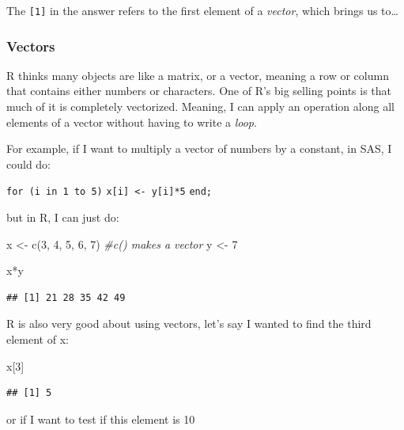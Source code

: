 \documentclass[
]{article}
\newenvironment{Shaded}{\begin{snugshade}}{\end{snugshade}}
\newcommand{\CommentTok}[1]{\textcolor[rgb]{0.56,0.35,0.01}{\textit{#1}}}
\newcommand{\DecValTok}[1]{\textcolor[rgb]{0.00,0.00,0.81}{#1}}
\newcommand{\FunctionTok}[1]{\textcolor[rgb]{0.00,0.00,0.00}{#1}}
\newcommand{\NormalTok}[1]{#1}
\newcommand{\OtherTok}[1]{\textcolor[rgb]{0.56,0.35,0.01}{#1}}
\newcommand{\SpecialCharTok}[1]{\textcolor[rgb]{0.00,0.00,0.00}{#1}}
\begin{document}
The \texttt{{[}1{]}} in the answer refers to the first element of a \emph{vector}, which
brings us to\ldots{}

\hypertarget{vectors}{%
\subsubsection{Vectors}\label{vectors}}

R thinks many objects are like a matrix, or a vector, meaning a row or
column that contains either numbers or characters. One of R's big
selling points is that much of it is completely vectorized. Meaning, I
can apply an operation along all elements of a vector without having to
write a \emph{loop}.

For example, if I want to multiply a vector of numbers by a constant, in
SAS, I could do:

\texttt{for\ (i\ in\ 1\ to\ 5)} \texttt{x{[}i{]}\ \textless{}-\ y{[}i{]}*5} \texttt{end;}

but in R, I can just do:

\begin{Shaded}
\begin{Highlighting}[]
\NormalTok{x }\OtherTok{\textless{}{-}} \FunctionTok{c}\NormalTok{(}\DecValTok{3}\NormalTok{, }\DecValTok{4}\NormalTok{, }\DecValTok{5}\NormalTok{, }\DecValTok{6}\NormalTok{, }\DecValTok{7}\NormalTok{)}
\CommentTok{\#c() makes a vector}
\NormalTok{y }\OtherTok{\textless{}{-}} \DecValTok{7}

\NormalTok{x}\SpecialCharTok{*}\NormalTok{y}
\end{Highlighting}
\end{Shaded}

\begin{verbatim}
## [1] 21 28 35 42 49
\end{verbatim}

R is also very good about using vectors, let's say I wanted to find the
third element of x:

\begin{Shaded}
\begin{Highlighting}[]
\NormalTok{x[}\DecValTok{3}\NormalTok{]}
\end{Highlighting}
\end{Shaded}

\begin{verbatim}
## [1] 5
\end{verbatim}

or if I want to test if this element is 10
\end{document}
